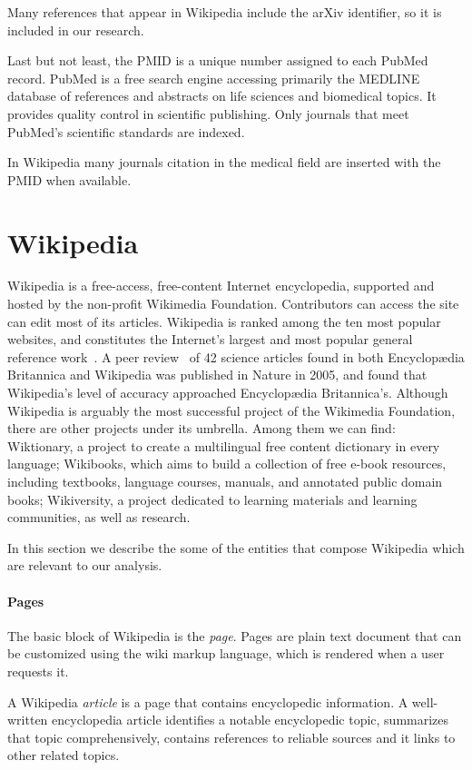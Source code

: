 Many references that appear in Wikipedia include the arXiv identifier, so it is included in our research.

Last but not least, the \acf{PMID} is a unique number assigned to each PubMed record.
PubMed is a free search engine accessing primarily the MEDLINE database of references and abstracts on life sciences and biomedical topics.
It provides quality control in scientific publishing. Only journals that meet PubMed's scientific standards are indexed.

In Wikipedia many journals citation in the medical field are inserted with the \ac{PMID} when available.



\section{Wikipedia}
\label{sec:wiki}
Wikipedia is a free-access, free-content Internet encyclopedia, supported and hosted by the non-profit Wikimedia Foundation.
Contributors can access the site can edit most of its articles.
Wikipedia is ranked among the ten most popular websites, and constitutes the Internet's largest and most popular general reference work~\cite{alexa}.
A peer review~\cite{Giles2005} of 42 science articles found in both Encyclopædia Britannica and Wikipedia was published in Nature in 2005, and found that Wikipedia's level of accuracy approached Encyclopædia Britannica's.
Although Wikipedia is arguably the most successful project of the Wikimedia Foundation, there are other projects under its umbrella.
Among them we can find: Wiktionary, a project to create a multilingual free content dictionary in every language; Wikibooks, which aims to build a collection of free e-book resources, including textbooks, language courses, manuals, and annotated public domain books; Wikiversity, a project dedicated to learning materials and learning communities, as well as research.

In this section we describe the some of the entities that compose Wikipedia which are relevant to our analysis.

\paragraph{Pages}
The basic block of Wikipedia is the \emph{page}.
Pages are plain text document that can be customized using the wiki markup language, which is rendered when a user requests it.

A Wikipedia \emph{article} is a page that contains encyclopedic information.
A well-written encyclopedia article identifies a notable encyclopedic topic, summarizes that topic comprehensively, contains references to reliable sources and it links to other related topics.

